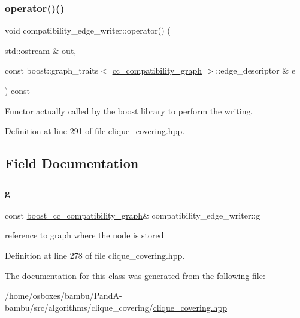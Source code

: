 \subsubsection{\texorpdfstring{operator()()}{operator()()}}
{\footnotesize\ttfamily void compatibility\+\_\+edge\+\_\+writer\+::operator() (\begin{DoxyParamCaption}\item[{std\+::ostream \&}]{out,  }\item[{const boost\+::graph\+\_\+traits$<$ \hyperlink{clique__covering__graph_8hpp_aa88e9419fe776ef37020cacd507cc4ad}{cc\+\_\+compatibility\+\_\+graph} $>$\+::edge\+\_\+descriptor \&}]{e }\end{DoxyParamCaption}) const\hspace{0.3cm}{\ttfamily [inline]}}



Functor actually called by the boost library to perform the writing. 



Definition at line 291 of file clique\+\_\+covering.\+hpp.



\subsection{Field Documentation}
\mbox{\label{classcompatibility__edge__writer_affd0efcf4091ba434faf4e2a0b11a70b}} 
\subsubsection{\texorpdfstring{g}{g}}
{\footnotesize\ttfamily const \hyperlink{clique__covering__graph_8hpp_af47b1c28cf9a2c360afafb8d80582ce6}{boost\+\_\+cc\+\_\+compatibility\+\_\+graph}\& compatibility\+\_\+edge\+\_\+writer\+::g\hspace{0.3cm}{\ttfamily [private]}}



reference to graph where the node is stored 



Definition at line 278 of file clique\+\_\+covering.\+hpp.



The documentation for this class was generated from the following file\+:\begin{DoxyCompactItemize}
\item 
/home/osboxes/bambu/\+Pand\+A-\/bambu/src/algorithms/clique\+\_\+covering/\hyperlink{clique__covering_8hpp}{clique\+\_\+covering.\+hpp}\end{DoxyCompactItemize}
